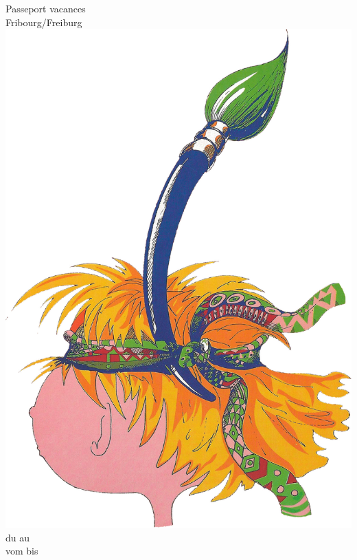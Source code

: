 \usepackage[nohead, textwidth=16.5cm, textheight=23.5cm, ignorehead, paper=a4paper]{geometry}
\usepackage{fontspec}
\usepackage{graphicx}
\usepackage[french]{babel}
\usepackage{hyperref}
\usepackage{tikz}
\usepackage{enumitem}
\usepackage{url}
\usepackage{tabulary}
\usepackage{enumitem}
\usepackage{titlesec}
\usepackage{titletoc}
\usepackage{etoolbox}
\usepackage{intcalc}
\usepackage[absolute]{textpos}




\setmainfont{Alegreya Sans}

\renewcommand{\leftmark}{}
\renewcommand{\rightmark}{}



\frontmatter
\begin{titlepage}
\begin{center}
{\fontsize{45}{40}\selectfont{}\pvfred{} Passeport vacances\\
\vspace*{3mm}
Fribourg/Freiburg \pvfryear}
\vfill
\includegraphics[width=.7\textwidth]{fig/logo.jpg}
\vfill
{\fontsize{32}{32}\selectfont{}du \pvfrstartfr{} au \pvfrendfr{} \pvfryear}\\
\vspace*{3mm}
{\fontsize{32}{32}\selectfont{}vom \pvfrstartde{} bis \pvfrendde{} \pvfryear}

\end{center}
\end{titlepage}
\ifbare
\else
\clearpage

\fi
\cleardoublepage
\tableofcontents
\cleardoublepage


